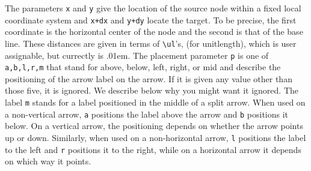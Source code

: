\documentclass[12pt]{article}
\begin{document}
{ The parameters \verb.x. and \verb.y. give the location of the source
node within a fixed local coordinate system and \verb-x+dx- and
\verb-y+dy- locate the target.  To be precise, the first coordinate is
the horizontal center of the node and the second is that of the base
line.  These distances are given in terms of \verb.\ul.'s,
(for unitlength), which is user assignable, but currectly is .01em.  The
placement parameter \verb.p. is one of \verb.a,b,l,r,m. that stand for
above, below, left, right, or mid and describe the positioning of the
arrow label on the arrow.  If it is given any value other than those
five, it is ignored.  We describe below why you might want it ignored.
The label \verb.m. stands for a label positioned in the middle
of a split arrow.  When used on a non-vertical arrow, \verb.a.
positions the label above the arrow and \verb.b. positions it
below.  On a vertical arrow, the positioning depends on whether the
arrow points up or down.  Similarly, when used on a non-horizontal
arrow, \verb.l. positions the label to the left and
\verb.r. positions it to the right, while on a horizontal arrow
it depends on which way it points.

}
\end{document}

